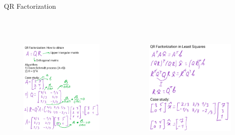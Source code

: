 \documentclass[aspectratio=169]{beamer}
\begin{document}
\begin{frame}[t]{QR Factorization}
\framesubtitle{}
\vspace{-0.8cm}
    \begin{columns}[T,onlytextwidth]
        \begin{column}{0.49\textwidth}
            \begin{figure}[H]
                \centering\includegraphics[height=6.5cm,width=1\textwidth,keepaspectratio]{AGLA2_for_slides_7.png}
                \label{fig:AGLA2_for_slides_7.png}
            \end{figure}    
        \end{column}
        \begin{column}{0.49\textwidth}
            \begin{figure}[H]
                \centering\includegraphics[height=6.5cm,width=1\textwidth,keepaspectratio]{AGLA2_for_slides_8.png}
                \label{fig:AGLA2_for_slides_8.png}
            \end{figure}    
        \end{column}
    \end{columns}
\end{frame}
\end{document}
